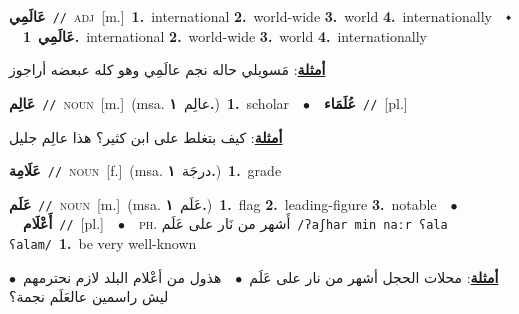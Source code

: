 \documentclass[10pt,a4paper,twoside]{article} %
\begin{document}
\begin{multicols}{2}
{\setlength\topsep{0pt}\textbf{\foreignlanguage{arabic}{عَالَمِي}}\ {\color{gray}\texttt{//}\color{black}}\ \textsc{adj}\ [m.]\ \textbf{1.}~international  \textbf{2.}~world-wide  \textbf{3.}~world  \textbf{4.}~internationally\ \ $\smblkdiamond$\ \ \setlength\topsep{0pt}\textbf{\foreignlanguage{arabic}{عَالَمِي}}\ \textbf{1.}~international  \textbf{2.}~world-wide  \textbf{3.}~world  \textbf{4.}~internationally\  \begin{flushright}\color{gray}\foreignlanguage{arabic}{\textbf{\underline{\foreignlanguage{arabic}{أمثلة}}}: مَسويلي حاله نجم عالَمِي وهو كله عبعضه أراجوز}\end{flushright}\color{black}} \vspace{2mm}

{\setlength\topsep{0pt}\textbf{\foreignlanguage{arabic}{عَالِم}}\ {\color{gray}\texttt{//}\color{black}}\ \textsc{noun}\ [m.]\ \color{gray}(msa. \foreignlanguage{arabic}{عالِم}~\foreignlanguage{arabic}{\textbf{١.}})\color{black}\ \textbf{1.}~scholar\ \ $\bullet$\ \ \setlength\topsep{0pt}\textbf{\foreignlanguage{arabic}{عُلَمَاء}}\ {\color{gray}\texttt{//}\color{black}}\ [pl.]\  \begin{flushright}\color{gray}\foreignlanguage{arabic}{\textbf{\underline{\foreignlanguage{arabic}{أمثلة}}}: كيف بتغلط على ابن كثير؟ هذا عالِم جليل}\end{flushright}\color{black}} \vspace{2mm}

{\setlength\topsep{0pt}\textbf{\foreignlanguage{arabic}{عَلَامِة}}\ {\color{gray}\texttt{//}\color{black}}\ \textsc{noun}\ [f.]\ \color{gray}(msa. \foreignlanguage{arabic}{درجَة}~\foreignlanguage{arabic}{\textbf{١.}})\color{black}\ \textbf{1.}~grade\ } \vspace{2mm}

{\setlength\topsep{0pt}\textbf{\foreignlanguage{arabic}{عَلَم}}\ {\color{gray}\texttt{//}\color{black}}\ \textsc{noun}\ [m.]\ \color{gray}(msa. \foreignlanguage{arabic}{عَلَم}~\foreignlanguage{arabic}{\textbf{١.}})\color{black}\ \textbf{1.}~flag  \textbf{2.}~leading-figure  \textbf{3.}~notable\ \ $\bullet$\ \ \setlength\topsep{0pt}\textbf{\foreignlanguage{arabic}{أَعْلَام}}\ {\color{gray}\texttt{//}\color{black}}\ [pl.]\ \ $\bullet$\ \ \textsc{ph.} \color{gray} \foreignlanguage{arabic}{أَشهر من نَار على عَلَم}\color{black}\ {\color{gray}\texttt{/{\sffamily ʔaʃhar min naːr ʕala ʕalam}/}\color{black}}\ \textbf{1.}~be very well-known\  \begin{flushright}\color{gray}\foreignlanguage{arabic}{\textbf{\underline{\foreignlanguage{arabic}{أمثلة}}}: محلات الحجل أشهر من نار على عَلَم\ $\bullet$\ \  هذول من أعْلام البلد لازم نحترمهم\ $\bullet$\ \  ليش راسمين عالعَلَم نجمة؟}\end{flushright}\color{black}} \vspace{2mm}


\end{multicols}
\end{document}
